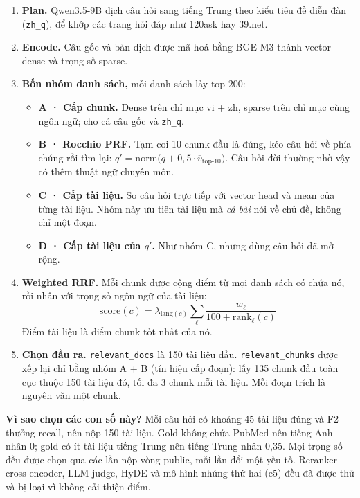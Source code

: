 \documentclass[10.5pt,a4paper]{article}
\begin{document}
\begin{enumerate}[label={\color{brand}\headfont\arabic*.},leftmargin=1.6em,itemsep=5pt]
\item \textbf{Plan.} Qwen3.5-9B dịch câu hỏi sang tiếng Trung theo kiểu tiêu đề diễn đàn (\texttt{zh\_q}), để khớp các trang hỏi đáp như 120ask hay 39.net.
\item \textbf{Encode.} Câu gốc và bản dịch được mã hoá bằng BGE-M3 thành vector dense và trọng số sparse.
\item \textbf{Bốn nhóm danh sách,} mỗi danh sách lấy top-200:
  \begin{itemize}
  \item \textbf{A · Cấp chunk.} Dense trên chỉ mục vi + zh, sparse trên chỉ mục cùng ngôn ngữ; cho cả câu gốc và \texttt{zh\_q}.
  \item \textbf{B · Rocchio PRF.} Tạm coi 10 chunk đầu là đúng, kéo câu hỏi về phía chúng rồi tìm lại:
  $q' = \mathrm{norm}\big(q + 0{,}5\cdot\overline{v}_{\text{top-10}}\big)$.
  Câu hỏi đời thường nhờ vậy có thêm thuật ngữ chuyên môn.
  \item \textbf{C · Cấp tài liệu.} So câu hỏi trực tiếp với vector head và mean của từng tài liệu. Nhóm này ưu tiên tài liệu mà \emph{cả bài} nói về chủ đề, không chỉ một đoạn.
  \item \textbf{D · Cấp tài liệu của $q'$.} Như nhóm C, nhưng dùng câu hỏi đã mở rộng.
  \end{itemize}
\item \textbf{Weighted RRF.} Mỗi chunk được cộng điểm từ mọi danh sách có chứa nó, rồi nhân với trọng số ngôn ngữ của tài liệu:
  \[ \mathrm{score}(c) = \lambda_{\mathrm{lang}(c)} \sum_{\ell} \frac{w_\ell}{100 + \mathrm{rank}_\ell(c)} \]
  Điểm tài liệu là điểm chunk tốt nhất của nó.
\item \textbf{Chọn đầu ra.} \texttt{relevant\_docs} là 150 tài liệu đầu. \texttt{relevant\_chunks} được xếp lại chỉ bằng nhóm A + B (tín hiệu cấp đoạn): lấy 135 chunk đầu toàn cục thuộc 150 tài liệu đó, tối đa 3 chunk mỗi tài liệu. Mỗi đoạn trích là nguyên văn một chunk.
\end{enumerate}

\begin{note}[colback=ambersoft,colframe=ambersoft,borderline west={3pt}{0pt}{amber}]
\textbf{Vì sao chọn các con số này?} Mỗi câu hỏi có khoảng 45 tài liệu đúng và F2 thưởng recall, nên nộp 150 tài liệu. Gold không chứa PubMed nên tiếng Anh nhân 0; gold có ít tài liệu tiếng Trung nên tiếng Trung nhân 0,35. Mọi trọng số đều được chọn qua các lần nộp vòng public, mỗi lần đổi một yếu tố. Reranker cross-encoder, LLM judge, HyDE và mô hình nhúng thứ hai (e5) đều đã được thử và bị loại vì không cải thiện điểm.
\end{note}
\end{document}
